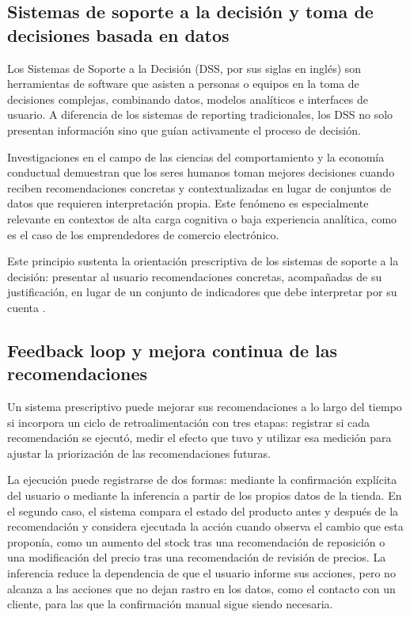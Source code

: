 \subsection{Sistemas de soporte a la decisión y toma de decisiones basada en datos}
\label{sec:dss}

Los Sistemas de Soporte a la Decisión (DSS, por sus siglas en inglés) son herramientas de software que asisten a personas o equipos en la toma de decisiones complejas, combinando datos, modelos analíticos e interfaces de usuario. A diferencia de los sistemas de reporting tradicionales, los DSS no solo presentan información sino que guían activamente el proceso de decisión.

Investigaciones en el campo de las ciencias del comportamiento y la economía conductual demuestran que los seres humanos toman mejores decisiones cuando reciben recomendaciones concretas y contextualizadas en lugar de conjuntos de datos que requieren interpretación propia. Este fenómeno es especialmente relevante en contextos de alta carga cognitiva o baja experiencia analítica, como es el caso de los emprendedores de comercio electrónico.

Este principio sustenta la orientación prescriptiva de los sistemas de soporte a la decisión: presentar al usuario recomendaciones concretas, acompañadas de su justificación, en lugar de un conjunto de indicadores que debe interpretar por su cuenta \parencite{Power2002, Kahneman2011}.

\subsection{Feedback loop y mejora continua de las recomendaciones}
\label{sec:feedback-loop}

Un sistema prescriptivo puede mejorar sus recomendaciones a lo largo del tiempo si incorpora un ciclo de retroalimentación con tres etapas: registrar si cada recomendación se ejecutó, medir el efecto que tuvo y utilizar esa medición para ajustar la priorización de las recomendaciones futuras.

La ejecución puede registrarse de dos formas: mediante la confirmación explícita del usuario o mediante la inferencia a partir de los propios datos de la tienda. En el segundo caso, el sistema compara el estado del producto antes y después de la recomendación y considera ejecutada la acción cuando observa el cambio que esta proponía, como un aumento del stock tras una recomendación de reposición o una modificación del precio tras una recomendación de revisión de precios. La inferencia reduce la dependencia de que el usuario informe sus acciones, pero no alcanza a las acciones que no dejan rastro en los datos, como el contacto con un cliente, para las que la confirmación manual sigue siendo necesaria.

